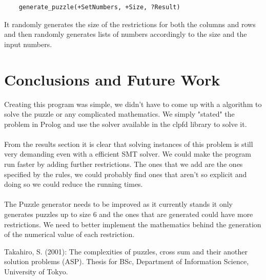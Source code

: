 \documentclass{llncs}
\begin{document}
	\begin{verbatim}
	generate_puzzle(+SetNumbers, +Size, ?Result)
	\end{verbatim}

It randomly generates the size of the restrictions for both the columns and rows and then randomly generates lists of numbers accordingly to the size and the input numbers.

\section{Conclusions and Future Work}
Creating this program was simple, we didn't have to come up with a algorithm to solve the puzzle or any complicated mathematics. We simply "stated" the problem in Prolog and use the solver available in the clpfd library to solve it.
\\~\\

From the results section it is clear that solving instances of this problem is still very demanding even with a efficient SMT solver. We could make the program run faster by adding further restrictions. The ones that we add are the ones specified by the rules, we could probably find ones that aren't so explicit and doing so we could reduce the running times. 
\\~\\

The Puzzle generator needs to be improved as it currently stands it only generates puzzles up to size 6 and the ones that are generated could have more restrictions. We need to better implement the mathematics behind the generation of the numerical value of each restriction.

%
%
\begin{thebibliography}{5}
%
Takahiro, S. (2001): The complexities of puzzles, cross sum and their another solution problems (ASP). Thesis for BSc, Department of Information Science, University of Tokyo.



\end{thebibliography}
\end{document}
